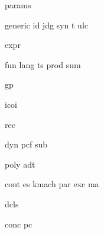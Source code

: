 {params}

{generic}
{id}
{jdg}
{syn}
{t}
{ulc}

{expr}

{fun}
{lang}
{ts}
{prod}
{sum}

{gp}

{icoi}

{rec}

{dyn}
{pcf}
{sub}

{poly}
{adt}

{cont}
{es}
{kmach}
{par}
{exc}
{ma}

{dcls}

{conc}
{pc}
